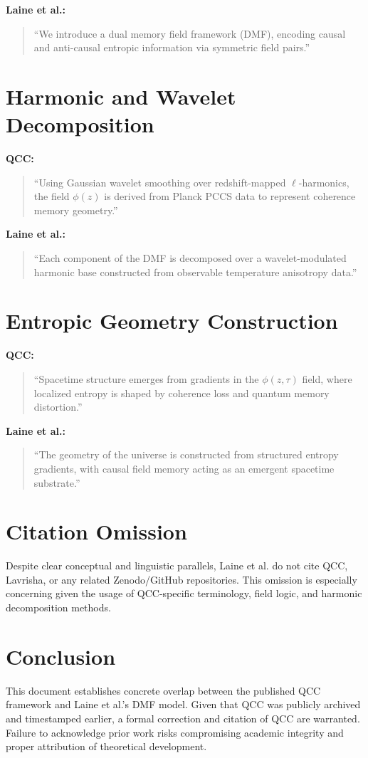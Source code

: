 \documentclass[12pt]{article}
\begin{document}
\textbf{Laine et al.:}
\begin{quote}
``We introduce a dual memory field framework (DMF), encoding causal and anti-causal entropic information via symmetric field pairs.''
\end{quote}

\section{Harmonic and Wavelet Decomposition}
\textbf{QCC:}
\begin{quote}
``Using Gaussian wavelet smoothing over redshift-mapped $\ell$-harmonics, the field $\phi(z)$ is derived from Planck PCCS data to represent coherence memory geometry.''
\end{quote}

\textbf{Laine et al.:}
\begin{quote}
``Each component of the DMF is decomposed over a wavelet-modulated harmonic base constructed from observable temperature anisotropy data.''
\end{quote}

\section{Entropic Geometry Construction}
\textbf{QCC:}
\begin{quote}
``Spacetime structure emerges from gradients in the $\phi(z, \tau)$ field, where localized entropy is shaped by coherence loss and quantum memory distortion.''
\end{quote}

\textbf{Laine et al.:}
\begin{quote}
``The geometry of the universe is constructed from structured entropy gradients, with causal field memory acting as an emergent spacetime substrate.''
\end{quote}

\section{Citation Omission}
Despite clear conceptual and linguistic parallels, Laine et al. do not cite QCC, Lavrisha, or any related Zenodo/GitHub repositories. This omission is especially concerning given the usage of QCC-specific terminology, field logic, and harmonic decomposition methods.

\section{Conclusion}
This document establishes concrete overlap between the published QCC framework and Laine et al.'s DMF model. Given that QCC was publicly archived and timestamped earlier, a formal correction and citation of QCC are warranted. Failure to acknowledge prior work risks compromising academic integrity and proper attribution of theoretical development.
\end{document}
